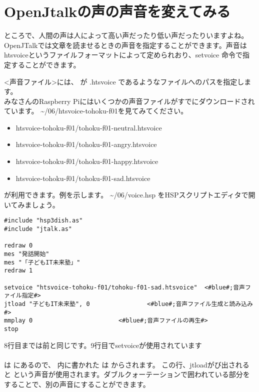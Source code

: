 \newpage
\section{OpenJtalkの声の声音を変えてみる}
ところで、人間の声は人によって高い声だったり低い声だったりいますよね。OpenJTalkでは文章を読ませるときの声音を指定することができます。声音はhtsvoiceというファイルフォーマットによって定められおり、setvoice 命令で指定することができます。\\

<声音ファイル>には、 が .htsvoice であるようなファイルへのパスを指定します。\\
みなさんのRaspberry Piにはいくつかの声音ファイルがすでにダウンロードされています。  \textasciitilde /06/htsvoice-tohoku-f01を見てみてください。

\begin{itemize}
\item htsvoice-tohoku-f01/tohoku-f01-neutral.htsvoice
\item htsvoice-tohoku-f01/tohoku-f01-angry.htsvoice
\item htsvoice-tohoku-f01/tohoku-f01-happy.htsvoice
\item htsvoice-tohoku-f01/tohoku-f01-sad.htsvoice
\end{itemize}

が利用できます。例を示します。 \textasciitilde /06/voice.hsp をHSPスクリプトエディタで開いてみましょう。\\

\begin{lstlisting}[caption=voice.hsp,label=voice.hsp]
#include "hsp3dish.as"
#include "jtalk.as"

redraw 0
mes "発話開始"
mes "「子どもIT未来塾」"
redraw 1

setvoice "htsvoice-tohoku-f01/tohoku-f01-sad.htsvoice"	<#blue#;音声ファイル指定#>
jtload "子どもIT未来塾", 0				<#blue#;音声ファイル生成と読み込み#>
mmplay 0						<#blue#;音声ファイルの再生#>
stop
\end{lstlisting}

8行目までは前と同じです。9行目でsetvoiceが使用されています\\
\\
 は  にあるので、
 内に書かれた 
は  からされます。
この行、jtloadがび出されると 
という声音が使用されます。ダブルクォーテーションで囲われている部分をすることで、別の声音にすることができます。\\

\begin{tcolorbox}[title=\useOmetoi]
\begin{enumerate}
\end{enumerate}
\end{tcolorbox}
